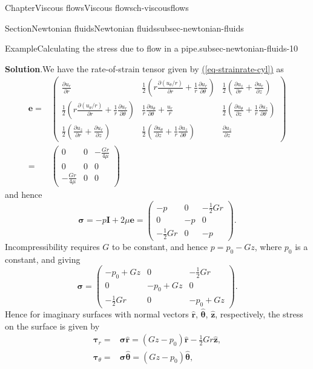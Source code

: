 \documentclass[oneside,10pt,]{book}
\newcommand{\blocktitlefont}{\relax}
\newcommand{\xreffont}{\relax}
\numberwithin{equation}{section}
\newcommand{\pd}[2]{\frac{\partial#1}{\partial#2}}
\newcommand{\be}{\boldsymbol{e}}
\newcommand{\bsigma}{\boldsymbol{\sigma}}
\newcommand{\btau}{\boldsymbol{\tau}}
\newcommand{\bI}{\boldsymbol{I}}
\begin{document}
\begin{chapterptx}{Chapter}{Viscous flows}{}{Viscous flows}{}{}{ch-viscousflows}
\begin{sectionptx}{Section}{Newtonian fluids}{}{Newtonian fluids}{}{}{subsec-newtonian-fluids}
\begin{example}{Example}{Calculating the stress due to flow in a pipe.}{subsec-newtonian-fluids-10}
\par\smallskip%
\noindent\textbf{\blocktitlefont Solution}.\hypertarget{subsec-newtonian-fluids-10-3}{}\quad{}We have the rate-of-strain tensor given by \hyperref[eq-strainrate-cyl]{({\xreffont\ref{eq-strainrate-cyl}})} as%
\begin{align*}
\be=&\left(\begin{matrix}
\pd{u_r}{r}&\frac12\left(r\pd{(u_\theta/r)}{r}+\frac1r\pd{u_r}{\theta}\right)&\frac12\left(\pd{u_z}{r}+\pd{u_r}{z}\right)\\
\frac12\left(r\pd{(u_\theta/r)}{r}+\frac1r\pd{u_r}{\theta}\right)&\frac1r\pd{u_\theta}{\theta}+\frac{u_r}{r}&\frac12\left(\pd{u_\theta}{z}+\frac1r\pd{u_z}{\theta}\right)\\
\frac12\left(\pd{u_z}{r}+\pd{u_r}{z}\right)&\frac12\left(\pd{u_\theta}{z}+\frac1r\pd{u_z}{\theta}\right)&\pd{u_z}{z}
\end{matrix}\right)\\
=&\left(\begin{matrix}0&0&-\frac{Gr}{4\mu}\\0&0&0\\-\frac{Gr}{4\mu}&0&0\end{matrix}\right)
\end{align*}
and hence%
\begin{equation*}
\bsigma=-p\bI+2\mu\be
=\left(\begin{matrix}-p&0&-\frac12Gr\\0&-p&0\\-\frac12Gr&0&-p\end{matrix}\right).
\end{equation*}
Incompressibility requires \(G\) to be constant, and hence \(p=p_0-Gz\), where \(p_0\) is a constant, and giving%
\begin{equation*}
\bsigma=\left(\begin{matrix}-p_0+Gz&0&-\frac12Gr\\0&-p_0+Gz&0\\-\frac12Gr&0&-p_0+Gz\end{matrix}\right).
\end{equation*}
Hence for imaginary surfaces with normal vectors \(\hat{\boldsymbol{r}}\), \(\hat{\boldsymbol{\theta}}\), \(\hat{\boldsymbol{z}}\), respectively, the stress on the surface is given by%
\begin{align*}
\btau_r=&\bsigma\hat{\boldsymbol{r}}=\left(Gz-p_0\right)\hat{\boldsymbol{r}}-\frac12Gr\hat{\boldsymbol{z}},\\
\btau_\theta=&\bsigma\hat{\boldsymbol{\theta}}=\left(Gz-p_0\right)\hat{\boldsymbol{\theta}},\\

\end{align*}
\end{example}
\end{sectionptx}
\end{chapterptx}
\end{document}
